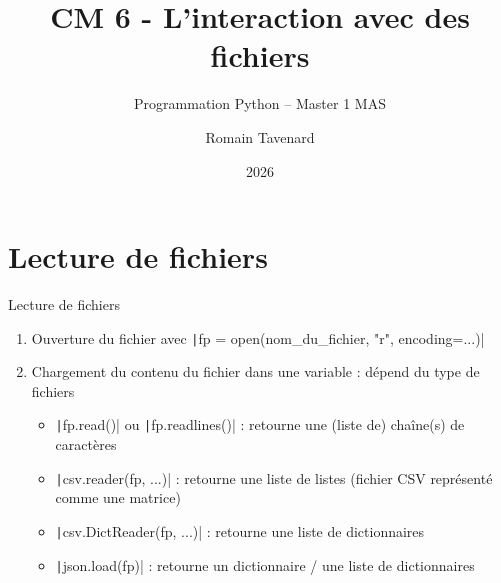 \documentclass[10pt]{beamer}
\title[M1 MAS -- Python -- Fichiers]{CM 6 - L'interaction avec des fichiers}
\subtitle{Programmation Python -- Master 1 MAS}
\author{Romain Tavenard}
\date{2026}
\institute{%
\hypersetup{urlcolor=.}
\makebox[2.2ex][c]{\faEnvelope}\enspace\href{mailto:romain.tavenard@univ-rennes2.fr}{\texttt{romain.tavenard@univ-rennes2.fr}}\\%
}
\begin{document}
\maketitle

\section{Lecture de fichiers}
\begin{frame}[fragile]{Lecture de fichiers}
  \begin{enumerate}
    \item Ouverture du fichier avec \texttt|fp = open(nom_du_fichier, "r", encoding=...)|
    \item Chargement du contenu du fichier dans une variable : dépend du type de fichiers
    \begin{itemize}
      \item \texttt|fp.read()| ou \texttt|fp.readlines()| : retourne une (liste de) chaîne(s) de caractères
      \item \texttt|csv.reader(fp, ...)| : retourne une liste de listes (fichier CSV représenté comme une matrice)
      \item \texttt|csv.DictReader(fp, ...)| : retourne une liste de dictionnaires
      \item \texttt|json.load(fp)| : retourne un dictionnaire / une liste de dictionnaires
    \end{itemize}
  \end{enumerate}

\end{frame}
\end{document}
